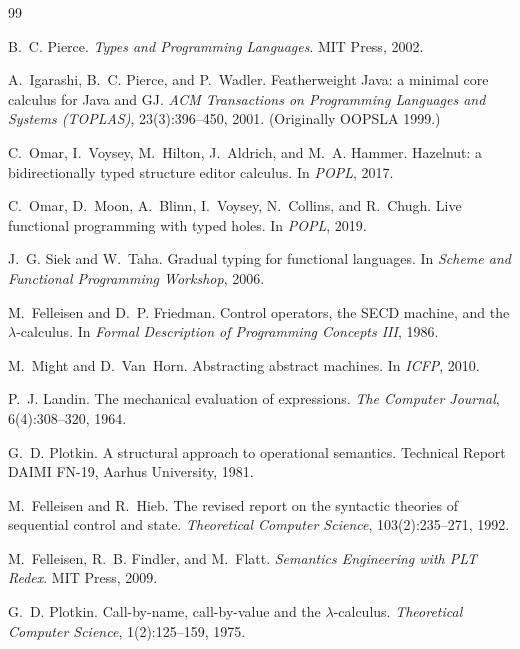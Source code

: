 \documentclass[11pt]{article}
\begin{document}
\begin{thebibliography}{99}

B.~C. Pierce.
\newblock \emph{Types and Programming Languages}.
\newblock MIT Press, 2002.

A.~Igarashi, B.~C. Pierce, and P.~Wadler.
\newblock Featherweight Java: a minimal core calculus for Java and GJ.
\newblock \emph{ACM Transactions on Programming Languages and Systems (TOPLAS)}, 23(3):396--450, 2001.
\newblock (Originally OOPSLA 1999.)

C.~Omar, I.~Voysey, M.~Hilton, J.~Aldrich, and M.~A. Hammer.
\newblock Hazelnut: a bidirectionally typed structure editor calculus.
\newblock In \emph{POPL}, 2017.

C.~Omar, D.~Moon, A.~Blinn, I.~Voysey, N.~Collins, and R.~Chugh.
\newblock Live functional programming with typed holes.
\newblock In \emph{POPL}, 2019.

J.~G. Siek and W.~Taha.
\newblock Gradual typing for functional languages.
\newblock In \emph{Scheme and Functional Programming Workshop}, 2006.

M.~Felleisen and D.~P. Friedman.
\newblock Control operators, the SECD machine, and the $\lambda$-calculus.
\newblock In \emph{Formal Description of Programming Concepts III}, 1986.

M.~Might and D.~Van~Horn.
\newblock Abstracting abstract machines.
\newblock In \emph{ICFP}, 2010.

P.~J. Landin.
\newblock The mechanical evaluation of expressions.
\newblock \emph{The Computer Journal}, 6(4):308--320, 1964.

G.~D. Plotkin.
\newblock A structural approach to operational semantics.
\newblock Technical Report DAIMI FN-19, Aarhus University, 1981.

M.~Felleisen and R.~Hieb.
\newblock The revised report on the syntactic theories of sequential control and state.
\newblock \emph{Theoretical Computer Science}, 103(2):235--271, 1992.

M.~Felleisen, R.~B. Findler, and M.~Flatt.
\newblock \emph{Semantics Engineering with PLT Redex}.
\newblock MIT Press, 2009.

G.~D. Plotkin.
\newblock Call-by-name, call-by-value and the $\lambda$-calculus.
\newblock \emph{Theoretical Computer Science}, 1(2):125--159, 1975.


\end{thebibliography}
\end{document}

